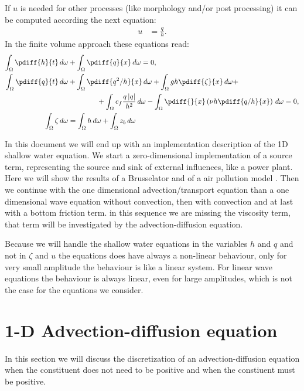 If $u$ is needed for other processes (like morphology and/or post processing) it can be computed according the next equation:
\begin{align}
    u & = \frac{q}{h}.
\end{align}
In the finite volume approach these equations read:
\begin{subequations}
    \begin{align}
        \int_\Omega \pdiff{h}{t}\, d\omega & +\int_\Omega \pdiff{q}{x}\, d\omega=0,
        \\
        \int_\Omega \pdiff{q}{t}\, d\omega & + \int_\Omega \pdiff{q^2/h}{x}\, d\omega + \int_\Omega gh \pdiff{\zeta}{x}\, d\omega  +
        \nonumber \\*
        & \qquad \qquad + \int_{\Omega} c_f\frac{q\abs{q}}{h^2} \, d\omega - \int_{\Omega} \pdiff{}{x}\left( \nu h \pdiff{q/h}{x}\right) \, d\omega= 0,
        \\
        \int_\Omega \zeta\, d\omega & = \int_\Omega h\, d\omega + \int_\Omega z_b\, d\omega
    \end{align}
\end{subequations}

In this document we will end up with an implementation description of the 1D shallow water equation.
We start a zero-dimensional implementation of a source term, representing the source and sink of external influences, like a power plant.
Here we will show the results of a Brusselator \citep{AultHolmgreen2003} and of a air pollution model \citep[ex.\ 1.1 pg.\ 7]{HundsdorferAndVerwer2003}.
Then we continue with the one dimensional advection/transport equation than a one dimensional wave equation without convection, then with convection and at last with a bottom friction term.
in this sequence we are missing the viscosity term, that term will be investigated by the advection-diffusion equation.

Because we will handle the shallow water equations in the variables $h$ and  $q$ and not in $\zeta$ and $u$ the equations does have always a non-linear behaviour, only for very small amplitude the behaviour is like a linear system.
For linear wave equations the behaviour is always linear, even for large amplitudes, which is not the case for the equations we consider.

%
\section{1-D Advection-diffusion equation}
In this section we will discuss the discretization of an advection-diffusion equation when the constituent does not need to be positive and when the constiuent must be positive.

